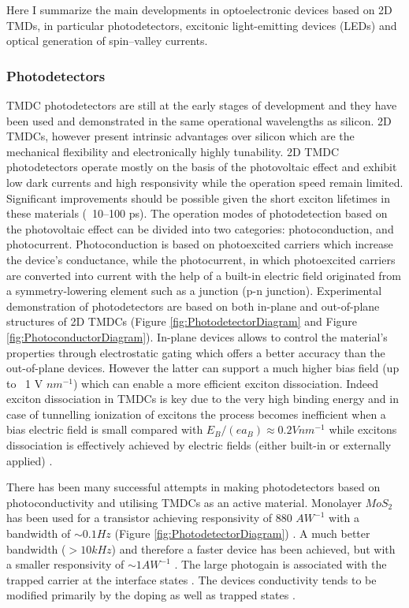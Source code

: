 Here I summarize the main developments in optoelectronic devices based on 2D TMDs, in particular photodetectors, excitonic light-emitting devices (LEDs) and optical generation of spin–valley currents. 

\subsubsection{Photodetectors}

TMDC photodetectors are still at the early stages of development and they have been used and demonstrated in the same operational wavelengths as silicon. 2D TMDCs, however present intrinsic advantages over silicon  which are the mechanical flexibility and electronically highly tunability.
2D TMDC photodetectors operate mostly on the basis of the photovoltaic effect and exhibit low dark currents and high responsivity while the operation speed remain limited. Significant improvements should be possible given the short exciton lifetimes in these materials (~10–100 ps)\cite{Massicotte2015}\cite{Korn2011}\cite{Wang2012}. The operation modes of photodetection based on the photovoltaic effect can be divided \cite{Sze2002} into two categories: photoconduction, and photocurrent. Photoconduction is based on photoexcited carriers which increase the device's conductance, while the photocurrent, in which photoexcited carriers are converted into current with the help of a built-in electric field originated from a symmetry-lowering element such as a junction (p-n junction).
Experimental demonstration of photodetectors are based on both in-plane and out-of-plane structures of 2D TMDCs (Figure \ref{fig:PhotodetectorDiagram} and Figure \ref{fig:PhotoconductorDiagram}). In-plane devices allows to control the material's properties through electrostatic gating which offers a better accuracy than the out-of-plane devices. However the latter can support a much higher bias field (up to ~1 V $nm^{-1}$) which can enable a more efficient exciton dissociation. Indeed exciton dissociation in TMDCs is key due to the very high binding energy and in case of tunnelling ionization of excitons the process becomes inefficient when a bias electric field is small compared with $E_B/(ea_B) \approx 0.2 V nm^{-1}$ \cite{Haug1994} while excitons dissociation is effectively achieved by electric fields (either built-in or externally applied) \cite{Mak2016}.

There has been many successful attempts in making photodetectors based on photoconductivity and utilising TMDCs as an active material. Monolayer $MoS_2$ has been used for a transistor achieving responsivity of 880 $AW^{-1}$ with a bandwidth of $\sim 0.1 Hz$ (Figure \ref{fig:PhotodetectorDiagram}) \cite{Lopez-Sanchez2013}. A much better bandwidth ($>10 kHz$) and therefore a faster device has been achieved, but with a smaller responsivity of $\sim 1 AW^{-1}$ \cite{Tsai2013}. The large photogain is associated with the trapped carrier at the interface states \cite{Katz2001}. The devices conductivity tends to be modified primarily by the doping as well as trapped states \cite{Tsai2013}\cite{Furchi2014}\cite{Mak2016}.


